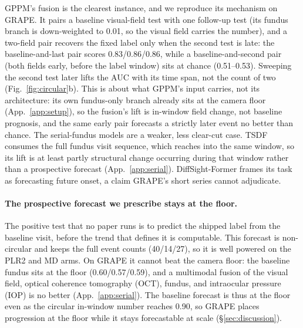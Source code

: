 GPPM's fusion is the clearest instance, and we reproduce its mechanism on GRAPE. It pairs a
baseline visual-field test with one follow-up test (its fundus branch is down-weighted to \num{0.01}, so the visual
field carries the number), and a two-field pair recovers the fixed label only when the second test is late: the
baseline-and-last pair scores \num{0.83}/\num{0.86}/\num{0.86}, while a baseline-and-second pair (both fields early,
before the label window) sits at chance (\num{0.51}--\num{0.53}). Sweeping the second test later lifts the AUC with its time span,
not the count of two (Fig.~\ref{fig:circular}b). This is about what GPPM's input carries, not its architecture: its own
fundus-only branch already sits at the camera floor (App.~\ref{app:setup}), so the fusion's lift is in-window field
change, not baseline prognosis, and the same early pair forecasts a strictly later event no better than chance. The
serial-fundus models are a
weaker, less clear-cut case. TSDF consumes the full fundus visit sequence, which
reaches into the same window, so its lift is at least partly structural change occurring during that window rather than
a prospective forecast (App.~\ref{app:serial}). DiffSight-Former frames its task as forecasting future onset, a claim
GRAPE's short series cannot adjudicate.

\paragraph{The prospective forecast we prescribe stays at the floor.} The positive test that no paper runs is to predict the
shipped label from the baseline visit, before the trend that defines it is computable. This forecast is
non-circular and keeps the full event counts (\num{40}/\num{14}/\num{27}), so it is
well powered on the PLR2 and MD arms. On GRAPE it cannot beat the camera floor: the baseline fundus sits at the floor
(\num{0.60}/\num{0.57}/\num{0.59}), and a multimodal fusion of the visual field, optical coherence tomography (OCT),
fundus, and intraocular pressure (IOP) is no better (App.~\ref{app:serial}). The baseline forecast is thus at the floor
even as the circular in-window number reaches \num{0.90}, so GRAPE places progression at the floor while it stays
forecastable at scale (\S\ref{sec:discussion}).

